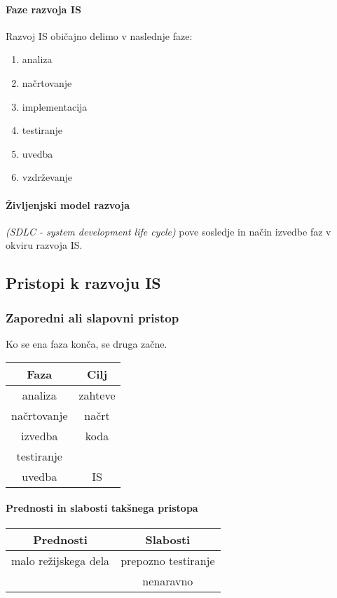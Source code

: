 \documentclass[a4paper,12pt]{report}
\begin{document}
   \paragraph{Faze razvoja IS} Razvoj IS običajno delimo v naslednje faze:
      \begin{enumerate}
         \item analiza
         \item načrtovanje
         \item implementacija
         \item testiranje
         \item uvedba
         \item vzdrževanje
      \end{enumerate}
   \paragraph{Življenjski model razvoja} \textit{(SDLC - system development life cycle)} pove sosledje in način izvedbe faz v okviru razvoja IS.

   \pagebreak

   \subsection{Pristopi k razvoju IS}
   \subsubsection{Zaporedni ali slapovni pristop}
   Ko se ena faza konča, se druga začne.

   \begin{center}
      \begin{tabular}{|c|c|}
         \hline
         \textbf{Faza} & \textbf{Cilj}\\
         \hline
         analiza & zahteve\\
         načrtovanje & načrt\\
         izvedba & koda\\
         testiranje&\\
         uvedba&IS\\
         \hline
      \end{tabular}
   \end{center}

   \paragraph{Prednosti in slabosti takšnega pristopa}\mbox{}
   \begin{center}
      \begin{tabular}{|c||c|}
         \hline
         \textbf{Prednosti} & \textbf{Slabosti}\\
         \hline
         malo režijskega dela & prepozno testiranje\\
         & nenaravno\\
         \hline
      \end{tabular}
   \end{center}
\end{document}
